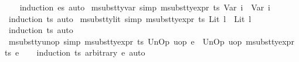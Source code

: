 \begin{isabellebody}
%
\isadelimproof
\ \ %
\endisadelimproof
%
\isatagproof
{}\isamarkupfalse%
\ {\isacharparenleft}{\kern0pt}induction\ es{\isacharsemicolon}{\kern0pt}\ auto{\isacharparenright}{\kern0pt}%
\endisatagproof
{\isafoldproof}%
%
\isadelimproof
\isanewline
%
\endisadelimproof
\isanewline
{}\isamarkupfalse%
\ msubst{\isacharunderscore}{\kern0pt}ty{\isacharunderscore}{\kern0pt}var\ {\isacharbrackleft}{\kern0pt}simp{\isacharbrackright}{\kern0pt}{\isacharcolon}{\kern0pt}\ {\isachardoublequoteopen}msubst{\isacharunderscore}{\kern0pt}ty{\isacharunderscore}{\kern0pt}expr\ ts\ {\isacharparenleft}{\kern0pt}Var\ i{\isacharparenright}{\kern0pt}\ {\isacharequal}{\kern0pt}\ {\isacharparenleft}{\kern0pt}Var\ i{\isacharparenright}{\kern0pt}{\isachardoublequoteclose}\isanewline
%
\isadelimproof
\ \ %
\endisadelimproof
%
\isatagproof
{}\isamarkupfalse%
\ {\isacharparenleft}{\kern0pt}induction\ ts{\isacharsemicolon}{\kern0pt}\ auto{\isacharparenright}{\kern0pt}%
\endisatagproof
{\isafoldproof}%
%
\isadelimproof
\isanewline
%
\endisadelimproof
\isanewline
{}\isamarkupfalse%
\ msubst{\isacharunderscore}{\kern0pt}ty{\isacharunderscore}{\kern0pt}lit\ {\isacharbrackleft}{\kern0pt}simp{\isacharbrackright}{\kern0pt}{\isacharcolon}{\kern0pt}\ {\isachardoublequoteopen}msubst{\isacharunderscore}{\kern0pt}ty{\isacharunderscore}{\kern0pt}expr\ ts\ {\isacharparenleft}{\kern0pt}Lit\ l{\isacharparenright}{\kern0pt}\ {\isacharequal}{\kern0pt}\ {\isacharparenleft}{\kern0pt}Lit\ l{\isacharparenright}{\kern0pt}{\isachardoublequoteclose}\isanewline
%
\isadelimproof
\ \ %
\endisadelimproof
%
\isatagproof
{}\isamarkupfalse%
\ {\isacharparenleft}{\kern0pt}induction\ ts{\isacharsemicolon}{\kern0pt}\ auto{\isacharparenright}{\kern0pt}%
\endisatagproof
{\isafoldproof}%
%
\isadelimproof
\isanewline
%
\endisadelimproof
\isanewline
{}\isamarkupfalse%
\ msubst{\isacharunderscore}{\kern0pt}ty{\isacharunderscore}{\kern0pt}unop\ {\isacharbrackleft}{\kern0pt}simp{\isacharbrackright}{\kern0pt}{\isacharcolon}{\kern0pt}\ {\isachardoublequoteopen}msubst{\isacharunderscore}{\kern0pt}ty{\isacharunderscore}{\kern0pt}expr\ ts\ {\isacharparenleft}{\kern0pt}UnOp\ uop\ e{\isacharparenright}{\kern0pt}\ {\isacharequal}{\kern0pt}\ UnOp\ uop\ {\isacharparenleft}{\kern0pt}msubst{\isacharunderscore}{\kern0pt}ty{\isacharunderscore}{\kern0pt}expr\ ts\ e{\isacharparenright}{\kern0pt}{\isachardoublequoteclose}\isanewline
%
\isadelimproof
\ \ %
\endisadelimproof
%
\isatagproof
{}\isamarkupfalse%
\ {\isacharparenleft}{\kern0pt}induction\ ts\ arbitrary{\isacharcolon}{\kern0pt}\ e{\isacharsemicolon}{\kern0pt}\ auto{\isacharparenright}{\kern0pt}%

\end{isabellebody}
